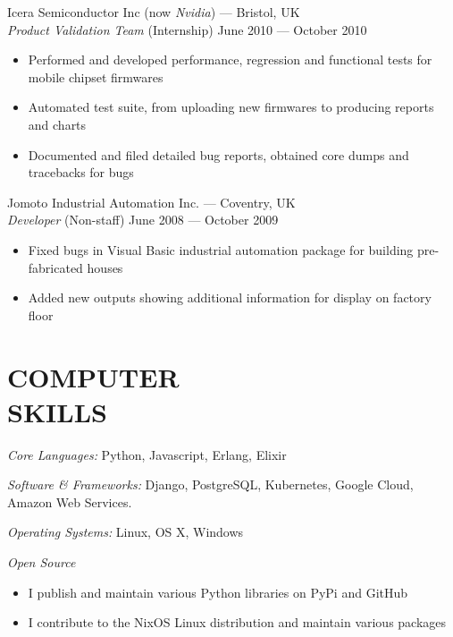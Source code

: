 \documentclass[margin, 10pt]{res}
\begin{document}
\begin{resume}
Icera Semiconductor Inc (now \textit{Nvidia}) --- Bristol, UK \\
{\sl Product Validation Team} \hfill (Internship) June 2010 --- October 2010 \\
\begin{itemize} \itemsep -1pt
\item Performed and developed performance, regression and functional tests for mobile chipset firmwares
\item Automated test suite, from uploading new firmwares to producing reports and charts
\item Documented and filed detailed bug reports, obtained core dumps and tracebacks for bugs
\end{itemize}

Jomoto Industrial Automation Inc. --- Coventry, UK \\
{\sl Developer} \hfill (Non-staff) June 2008 --- October 2009 \\
\begin{itemize} \itemsep -1pt
\item Fixed bugs in Visual Basic industrial automation package for building pre-fabricated houses
\item Added new outputs showing additional information for display on factory floor
\end{itemize}


\section{COMPUTER \\ SKILLS}

{\sl Core Languages:}
Python, Javascript, Erlang, Elixir

{\sl Software \& Frameworks:}
Django, PostgreSQL, Kubernetes, Google Cloud, Amazon Web Services.

{\sl Operating Systems:} Linux, OS X, Windows

{\sl Open Source}
\begin{itemize}
\item I publish and maintain various Python libraries on PyPi and GitHub
\item I contribute to the NixOS Linux distribution and maintain various packages
\end{itemize}


\end{resume}
\end{document}
